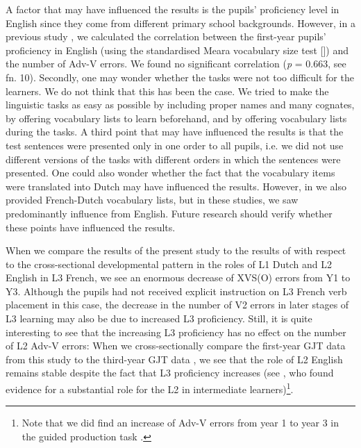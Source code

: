 \documentclass[output=paper,modfonts,nonflat, newtxmath]{langsci/langscibook}
\begin{document}
A factor that may have influenced the results is the pupils’ proficiency level in English since they come from different primary school backgrounds. However, in a previous study \citep{StadtEtAl2018Longitudinal}, we calculated the correlation between the first-year pupils’ proficiency in English (using the standardised Meara vocabulary size test [\citealt{Meara2010}]) and the number of Adv-V errors. We found no significant correlation (\textit{p} = 0.663, see fn. 10). Secondly, one may wonder whether the tasks were not too difficult for the learners. We do not think that this has been the case. We tried to make the linguistic tasks as easy as possible by including proper names and many cognates, by offering vocabulary lists to learn beforehand, and by offering vocabulary lists during the tasks. A third point that may have influenced the results is that the test sentences were presented only in one order to all pupils, i.e. we did not use different versions of the tasks with different orders in which the sentences were presented. One could also wonder whether the fact that the vocabulary items were translated into Dutch may have influenced the results. However, in \citet{StadtEtAl2016, StadtEtAl2018Exposure} we also provided French-Dutch vocabulary lists, but in these studies, we saw predominantly influence from English. Future research should verify whether these points have influenced the results.

  When we compare the results of the present study to the results of \citet{StadtEtAl2016} with respect to the cross-sectional developmental pattern in the roles of L1 Dutch and L2 English in L3 French, we see an enormous decrease of XVS(O) errors from Y1 to Y3. Although the pupils had not received explicit instruction on L3 French verb placement in this case, the decrease in the number of V2 errors in later stages of L3 learning may also be due to increased L3 proficiency. Still, it is quite interesting to see that the increasing L3 proficiency has no effect on the number of L2 Adv-V errors: When we cross-sectionally compare the first-year GJT data from this study to the third-year GJT data \citep{StadtEtAl2016}, we see that the role of L2 English remains stable despite the fact that L3 proficiency increases (see \citealt{Falk2010}, who found evidence for a substantial role for the L2 in intermediate learners)\footnote{ \textrm{Note that we did find an increase of Adv-V errors from year 1 to year 3 in the guided production task \citep{StadtEtAl2018Bilingual}.}}.
\end{document}
